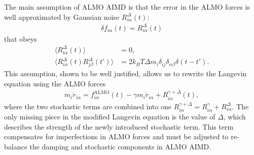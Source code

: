 \documentclass[aip,jcp,reprint,amsmath,amssymb]{revtex4-1}
\begin{document}
The main assumption of ALMO AIMD is that the error in the ALMO forces is well approximated by Gaussian noise $R^{\Delta}_{i\alpha} (t)$:
%
\begin{align}
\label{eq:assumption}
\delta f_{i\alpha}(t) = R^{\Delta}_{i\alpha} (t)
\end{align}
%
that obeys
%
\begin{align}
\label{eq:stochastic2}
\langle R^{\Delta}_{i\alpha} (t) \rangle &= 0, \\
\label{eq:stochastic3}
\langle R^{\Delta}_{i\alpha} (t)  R^{\Delta}_{j\beta} (t') \rangle &= 2 k_B T \Delta m_i \delta_{ij} \delta_{\alpha\beta} \delta(t-t') .
\end{align}
%
This assumption, shown to be well justified, allows us to rewrite the Langevin equation using the ALMO forces
%
\begin{align}
\label{eq:langevin2}
m_i \ddot{r}_{i\alpha} = f^{\text{ALMO}}_{i\alpha}(t) - \gamma m_i \dot{r}_{i\alpha} + R^{\gamma + \Delta}_{i\alpha} (t),
\end{align}
%
where the two stochastic terms are combined into one $R^{\gamma + \Delta}_{i\alpha} = R^{\gamma}_{i\alpha} + R^{\Delta}_{i\alpha}$. 
The only missing piece in the modified Langevin equation is the value of $\Delta$, which describes the strength of the newly introduced stochastic term. 
This term compensates for imperfections in ALMO forces and must be adjusted to re-balance the damping and stochastic components in ALMO AIMD.


\end{document}
